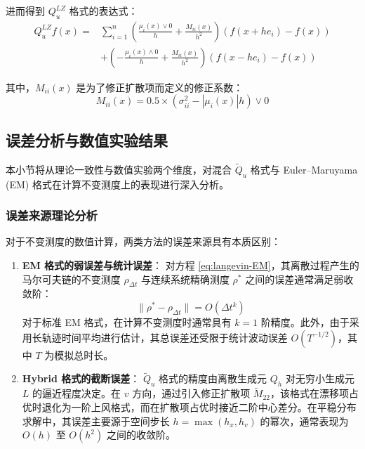 	进而得到 $Q_u^{LZ}$ 格式的表达式：
	\begin{equation}
		\begin{aligned}
			Q_u^{LZ} f(x) = & \sum_{i=1}^{n} \left( \frac{\mu_i(x) \vee 0}{h} + \frac{M_{ii}(x)}{h^2} \right) \left( f(x+he_i) - f(x) \right) \\
			& + \left( -\frac{\mu_i(x) \wedge 0}{h} + \frac{M_{ii}(x)}{h^2} \right) \left( f(x-he_i) - f(x) \right)
		\end{aligned}
	\end{equation}
	
	其中，$M_{ii}(x)$ 是为了修正扩散项而定义的修正系数：
	\begin{equation}
		M_{ii}(x) = 0.5 \times (\sigma_{ii}^2 - |\mu_i(x)|h) \vee 0
	\end{equation}
	
	
	\subsection{误差分析与数值实验结果}
	
	本小节将从理论一致性与数值实验两个维度，对混合 $\widetilde{Q}_u$ 格式与 Euler--Maruyama (EM) 格式在计算不变测度上的表现进行深入分析。
	
	
	\subsubsection{误差来源理论分析}
	
	对于不变测度的数值计算，两类方法的误差来源具有本质区别：
	
	\begin{enumerate}
		\item \textbf{EM 格式的弱误差与统计误差}：
		对方程 \eqref{eq:langevin-EM}，其离散过程产生的马尔可夫链的不变测度 $\rho_{\Delta t}$ 与连续系统精确测度 $\rho^*$ 之间的误差通常满足弱收敛阶：
		\[ \|\rho^* - \rho_{\Delta t}\| = O(\Delta t^k) \]
		对于标准 EM 格式，在计算不变测度时通常具有 $k=1$ 阶精度。此外，由于采用长轨迹时间平均进行估计，其总误差还受限于统计波动误差 $O(T^{-1/2})$，其中 $T$ 为模拟总时长。
		
		\item \textbf{Hybrid 格式的截断误差}：
		$\widetilde{Q}_u$ 格式的精度由离散生成元 $Q_h$ 对无穷小生成元 $L$ 的逼近程度决定。在 $v$ 方向，通过引入修正扩散项 $\widetilde{M}_{22}$，该格式在漂移项占优时退化为一阶上风格式，而在扩散项占优时接近二阶中心差分。在平稳分布求解中，其误差主要源于空间步长 $h = \max(h_x, h_v)$ 的幂次，通常表现为 $O(h)$ 至 $O(h^2)$ 之间的收敛阶。
	\end{enumerate}
	
